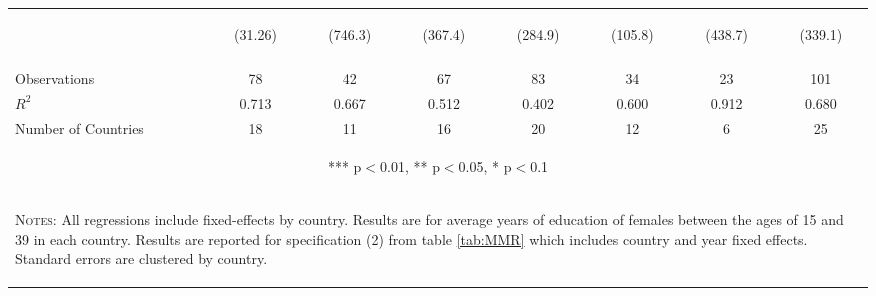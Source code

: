 \begin{subtables}
\begin{landscape}
\begin{table}[htpb!]
\begin{center}
\begin{tabular}{lccccccc}
	& \begin{footnotesize}	(31.26)	\end{footnotesize} & \begin{footnotesize}	(746.3)	\end{footnotesize} & \begin{footnotesize}	(367.4)	\end{footnotesize} & \begin{footnotesize}	(284.9)	\end{footnotesize} & \begin{footnotesize}	(105.8)	\end{footnotesize} & \begin{footnotesize}	(438.7)	\end{footnotesize} & \begin{footnotesize}	(339.1)	\end{footnotesize} \\
\vspace{4pt} & \begin{footnotesize}\end{footnotesize} & \begin{footnotesize}\end{footnotesize} & \begin{footnotesize}\end{footnotesize} & \begin{footnotesize}\end{footnotesize} & \begin{footnotesize}\end{footnotesize} & \begin{footnotesize}\end{footnotesize} & \begin{footnotesize}\end{footnotesize} \\															
Observations	&	78	&	42	&	67	&	83	&	34	&	23	&	101	\\
$R^2$	&	0.713	&	0.667	&	0.512	&	0.402	&	0.600	&	0.912	&	0.680	\\
Number of Countries	&	18	&	11	&	16	&	20	&	12	&	6	&	25	\\ \midrule
\multicolumn{8}{c}{\begin{footnotesize} *** p$<$0.01, ** p$<$0.05, * p$<$0.1\end{footnotesize}} \\															
\multicolumn{8}{p{20cm}}{\begin{footnotesize} \textsc{Notes:} All regressions include fixed-effects by country.  Results are for average years of education of females between the ages of 15 and 39 in each country.  Results are reported for specification (2) from table \ref{tab:MMR} which includes country and year fixed effects.  Standard errors are clustered by country. \end{footnotesize}} \\															

\end{tabular}
\end{center}
\end{table}
\end{landscape}
\end{subtables}
